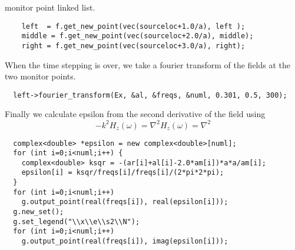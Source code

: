 monitor point linked list.
\begin{verbatim}
    left  = f.get_new_point(vec(sourceloc+1.0/a), left );
    middle = f.get_new_point(vec(sourceloc+2.0/a), middle);
    right = f.get_new_point(vec(sourceloc+3.0/a), right);
\end{verbatim}
\begin{comment}
    f.step();
  }
  grace g("eps", dirname);
  complex<double> *al, *ar, *am, *freqs;
  int numl, numr;
  master_printf("Working on left fourier transform...\n");
\end{comment}
When the time stepping is over, we take a fourier transform of the fields
at the two monitor points.
\begin{verbatim}
  left->fourier_transform(Ex, &al, &freqs, &numl, 0.301, 0.5, 300);
\end{verbatim}
\begin{comment}
  delete[] freqs;
  master_printf("Working on middle fourier transform...\n");
  middle->fourier_transform(Ex, &am, &freqs, &numr, 0.301, 0.5, 300);
  delete[] freqs;
  master_printf("Working on right fourier transform...\n");
  right->fourier_transform(Ex, &ar, &freqs, &numr, 0.301, 0.5, 300);
  if (numl != numr)
     master_printf("Aaack you need both nums to be the same!\n");
  g.new_set();
  g.set_legend("\\x\\e\\s1\\N");
\end{comment}
Finally we calculate epsilon from the second derivative of the field using
\begin{equation*}
-k^2 H_z(\omega) = \nabla^2 H_z(\omega) = \nabla^2
\end{equation*}
\begin{verbatim}
  complex<double> *epsilon = new complex<double>[numl];
  for (int i=0;i<numl;i++) {
    complex<double> ksqr = -(ar[i]+al[i]-2.0*am[i])*a*a/am[i];
    epsilon[i] = ksqr/freqs[i]/freqs[i]/(2*pi*2*pi);
  } 
  for (int i=0;i<numl;i++)
    g.output_point(real(freqs[i]), real(epsilon[i]));
  g.new_set();
  g.set_legend("\\x\\e\\s2\\N");
  for (int i=0;i<numl;i++)
    g.output_point(real(freqs[i]), imag(epsilon[i]));
\end{verbatim}
\begin{comment}
  g.new_set();
  g.set_legend("analytic \\x\\e\\s1\\N");
  for (int i=0;i<numl;i++)
    g.output_point(real(freqs[i]),
                   real(f.analytic_epsilon(real(freqs[i]),vec(sourceloc+3.0/a))));
  g.new_set();
  g.set_legend("analytic \\x\\e\\s2\\N");
  for (int i=0;i<numl;i++)
    g.output_point(real(freqs[i]),
                   imag(f.analytic_epsilon(real(freqs[i]),vec(sourceloc+3.0/a))));
}
\end{comment}



